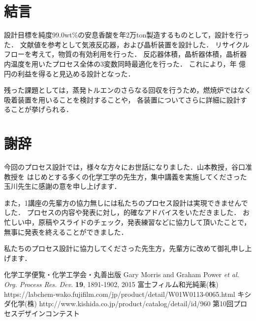 \documentclass[a4j]{jsreport}
\begin{document}
\newpage
\chapter{結言}
設計目標を純度99.0wt\%の安息香酸を年2万ton製造するものとして，設計を行った．
文献値を参考として気液反応器，および晶析装置を設計した．
リサイクルフローを考えて，物質の有効利用を行った．
反応器体積，晶析器体積，晶析器内温度を用いたプロセス全体の3変数同時最適化を行った．
これにより，年 億円の利益を得ると見込める設計となった．
\par
残った課題としては，蒸発トルエンのさらなる回収を行うため，燃焼炉ではなく吸着装置を用いることを検討することや，
各装置についてさらに詳細に設計することが挙げられる．

\newpage
\chapter*{謝辞}
今回のプロセス設計では，様々な方々にお世話になりました．山本教授，谷口准教授を
はじめとする多くの化学工学の先生方，集中講義を実施してくださった玉川先生に感謝の意を申し上げます．
\par
また，1講座の先輩方の協力無しには私たちのプロセス設計は実現できませんでした．
プロセスの内容や発表に対し，的確なアドバイスをいただきました．
お忙しい中，原稿やスライドのチェック，発表練習などに協力して頂いたことで，無事に発表を終えることができました．
\par
私たちのプロセス設計に協力してくださった先生方，先輩方に改めて御礼申し上げます．

\newpage
\newpage

\begin{thebibliography}{10}
     化学工学便覧・化学工学会・丸善出版
     Gary Morris and  Graham Power \textit{et al.  Org. Process Res. Dev.} \textbf{19}, 1891-1902, 2015
     富士フィルム和光純薬(株) https://labchem-wako.fujifilm.com/jp/product/detail/W01W0113-0065.html
     キシダ化学(株) http://www.kishida.co.jp/product/catalog/detail/id/960
     第10回プロセスデザインコンテスト
\end{thebibliography}

\newpage
\end{document}
